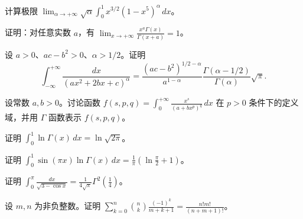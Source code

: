 \newpage
\noindent\begin{minipage}{\textwidth}
计算极限 $\displaystyle\lim_{\alpha\to+\infty}\sqrt\alpha\int_0^1x^{3/2}(1-x^5)^\alpha\,dx$。
\end{minipage}\par\vfill
\noindent\begin{minipage}{\textwidth}
证明：对任意实数 $a$，有 $\displaystyle\lim_{x\to+\infty}\frac{x^a\Gamma(x)}{\Gamma(x+a)}=1$。
\end{minipage}\par\vfill
\noindent\begin{minipage}{\textwidth}
设 $a>0$、$ac-b^2>0$、$\alpha>1/2$。证明\[\int_{-\infty}^{+\infty}\frac{dx}{(ax^2+2bx+c)^\alpha}=\frac{(ac-b^2)^{1/2-\alpha}}{a^{1-\alpha}}\frac{\Gamma(\alpha-1/2)}{\Gamma(\alpha)}\sqrt\pi.\]
\end{minipage}\par\vfill
\newpage
\noindent\begin{minipage}{\textwidth}
设常数 $a,b>0$。讨论函数 $\displaystyle f(s,p,q)=\int_0^{+\infty}\frac{x^s}{(a+bx^p)^q}\,dx$ 在 $p>0$ 条件下的定义域，并用 $\Gamma$ 函数表示 $f(s,p,q)$。
\end{minipage}\par\vfill
\noindent\begin{minipage}{\textwidth}
证明 $\displaystyle\int_0^1\ln\Gamma(x)\,dx=\ln\sqrt{2\pi}$。
\end{minipage}\par\vfill
\noindent\begin{minipage}{\textwidth}
证明 $\displaystyle\int_0^1\sin(\pi x)\ln\Gamma(x)\,dx=\frac1\pi\left(\ln\frac\pi2+1\right)$。
\end{minipage}\par\vfill
\newpage
\noindent\begin{minipage}{\textwidth}
证明 $\displaystyle\int_0^\pi\frac{dx}{\sqrt{3-\cos x}}=\frac1{4\sqrt\pi}\Gamma^2\left(\frac14\right)$。
\end{minipage}\par\vfill
\noindent\begin{minipage}{\textwidth}
设 $m,n$ 为非负整数。证明 $\displaystyle\sum_{k=0}^n\binom nk\frac{(-1)^k}{m+k+1}=\frac{n!m!}{(n+m+1)!}$。
\end{minipage}\par\vfill
